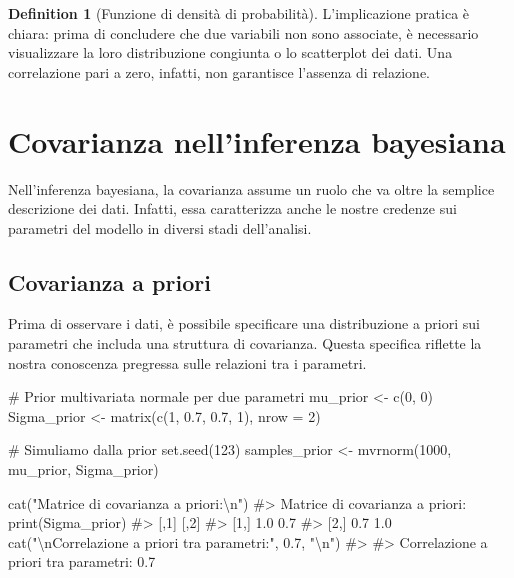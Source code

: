\documentclass[
  letterpaper,
  DIV=11,
  numbers=noendperiod,
  oneside]{scrreprt}
\newenvironment{Shaded}{\begin{snugshade}}{\end{snugshade}}
\newcommand{\AttributeTok}[1]{\textcolor[rgb]{0.40,0.45,0.13}{#1}}
\newcommand{\CommentTok}[1]{\textcolor[rgb]{0.37,0.37,0.37}{#1}}
\newcommand{\DecValTok}[1]{\textcolor[rgb]{0.68,0.00,0.00}{#1}}
\newcommand{\FloatTok}[1]{\textcolor[rgb]{0.68,0.00,0.00}{#1}}
\newcommand{\FunctionTok}[1]{\textcolor[rgb]{0.28,0.35,0.67}{#1}}
\newcommand{\NormalTok}[1]{\textcolor[rgb]{0.00,0.23,0.31}{#1}}
\newcommand{\OtherTok}[1]{\textcolor[rgb]{0.00,0.23,0.31}{#1}}
\newcommand{\SpecialCharTok}[1]{\textcolor[rgb]{0.37,0.37,0.37}{#1}}
\newcommand{\StringTok}[1]{\textcolor[rgb]{0.13,0.47,0.30}{#1}}
\theoremstyle{definition}
\theoremstyle{plain}
\theoremstyle{definition}
\newtheorem{definition}{Definition}[chapter]
\theoremstyle{remark}
\begin{document}
\begin{definition}[Funzione di densità di
probabilità]
L'implicazione pratica è chiara: prima di concludere che due variabili
non sono associate, è necessario visualizzare la loro distribuzione
congiunta o lo scatterplot dei dati. Una correlazione pari a zero,
infatti, non garantisce l'assenza di relazione.

\section{Covarianza nell'inferenza
bayesiana}\label{covarianza-nellinferenza-bayesiana}

Nell'inferenza bayesiana, la covarianza assume un ruolo che va oltre la
semplice descrizione dei dati. Infatti, essa caratterizza anche le
nostre credenze sui parametri del modello in diversi stadi dell'analisi.

\subsection{Covarianza a priori}\label{covarianza-a-priori}

Prima di osservare i dati, è possibile specificare una distribuzione a
priori sui parametri che includa una struttura di covarianza. Questa
specifica riflette la nostra conoscenza pregressa sulle relazioni tra i
parametri.

\begin{Shaded}
\begin{Highlighting}[]
\CommentTok{\# Prior multivariata normale per due parametri}
\NormalTok{mu\_prior }\OtherTok{\textless{}{-}} \FunctionTok{c}\NormalTok{(}\DecValTok{0}\NormalTok{, }\DecValTok{0}\NormalTok{)}
\NormalTok{Sigma\_prior }\OtherTok{\textless{}{-}} \FunctionTok{matrix}\NormalTok{(}\FunctionTok{c}\NormalTok{(}\DecValTok{1}\NormalTok{, }\FloatTok{0.7}\NormalTok{, }\FloatTok{0.7}\NormalTok{, }\DecValTok{1}\NormalTok{), }\AttributeTok{nrow =} \DecValTok{2}\NormalTok{)}

\CommentTok{\# Simuliamo dalla prior}
\FunctionTok{set.seed}\NormalTok{(}\DecValTok{123}\NormalTok{)}
\NormalTok{samples\_prior }\OtherTok{\textless{}{-}} \FunctionTok{mvrnorm}\NormalTok{(}\DecValTok{1000}\NormalTok{, mu\_prior, Sigma\_prior)}

\FunctionTok{cat}\NormalTok{(}\StringTok{"Matrice di covarianza a priori:}\SpecialCharTok{\textbackslash{}n}\StringTok{"}\NormalTok{)}
\CommentTok{\#\textgreater{} Matrice di covarianza a priori:}
\FunctionTok{print}\NormalTok{(Sigma\_prior)}
\CommentTok{\#\textgreater{}      [,1] [,2]}
\CommentTok{\#\textgreater{} [1,]  1.0  0.7}
\CommentTok{\#\textgreater{} [2,]  0.7  1.0}
\FunctionTok{cat}\NormalTok{(}\StringTok{"}\SpecialCharTok{\textbackslash{}n}\StringTok{Correlazione a priori tra parametri:"}\NormalTok{, }\FloatTok{0.7}\NormalTok{, }\StringTok{"}\SpecialCharTok{\textbackslash{}n}\StringTok{"}\NormalTok{)}
\CommentTok{\#\textgreater{} }
\CommentTok{\#\textgreater{} Correlazione a priori tra parametri: 0.7}


\end{Highlighting}
\end{Shaded}
\end{definition}
\end{document}
